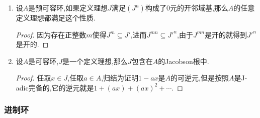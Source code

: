 \begin{enumerate}
\begin{proof}
    	(1)推(2)平凡.(2)推(3)是因为如果$x\in A$是$A/J_0$的幂零元,那么$x$是拓扑幂零元,进而$J_0+Ax$也是定义理想(因为如果$x^n\in J_0$,那么$(J_0+Ax)^n\subseteq J_0$,并且$J_0+Ax$是开的),于是只要$J_0$是极大的定义理想,就有$x\in J_0$.最后(3)推(1)是因为一样的理由说明所有拓扑幂零元都包含在$J_0$中.最后明显的如果最大定义理想存在它一定是拓扑幂零元构成的理想,于是最大定义理想存在等价于讲拓扑幂零元理想$\mathfrak{T}$是定义理想,而这等价于讲存在某个次幂$\mathfrak{T}^n\subseteq J$,按照$\mathfrak{T}$就是$A/J$的幂零根在$A$中的原像,于是这等价于讲$A/J$的幂零根是幂零的.
    \end{proof}
    \item 设$A$是预可容环,如果定义理想$J$满足$(J^n)$构成了0元的开邻域基,那么$A$的任意定义理想都满足这个性质.
    \begin{proof}
    	
    	因为存在正整数$m$使得$J^m\subseteq J'$,进而$J^{mn}\subseteq {J'}^n$,由于$J^{mn}$是开的就得到${J'}^n$是开的.
    \end{proof}
    \item 设$A$是可容环,$J$是一个定义理想,那么$J$包含在$A$的Jacobson根中.
    \begin{proof}
    	
    	任取$x\in J$,任取$a\in A$,归结为证明$1-ax$是$A$的可逆元,但是按照$A$是J-adic完备的,它的逆元就是$1+(ax)+(ax)^2+\cdots$.
    \end{proof}
\end{enumerate}
\subsubsection{进制环}

